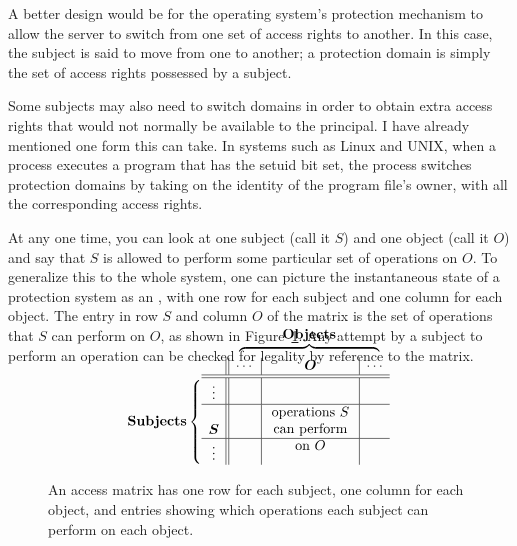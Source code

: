 A better design would be for the operating system's protection mechanism
to allow the server to switch from one set of access rights to
another.  In this case, the subject is said to move from one
 to another; a protection domain is
simply the set of access rights possessed by a subject.

Some subjects may also need to switch domains in order to obtain extra
access rights that would not normally be available to the principal.
I have already mentioned one form this can take.  In systems such as
Linux and UNIX, when a process executes a program that has the setuid
bit set, the process switches protection domains by taking on the
identity of the program file's owner, with all the corresponding
access rights.

At any one time, you can look at one subject (call it $S$) and
one object (call it $O$) and say that $S$ is allowed to perform
some particular set of operations on $O$.  To generalize this to the
whole system, one can picture the instantaneous state of a protection
system as an , with one row for each subject and
one column for each object.  The entry in row $S$ and column $O$ of
the matrix is the set of operations that $S$ can perform on $O$, as
shown in Figure~\ref{scan-7-3}.  Any
attempt by a subject to perform an operation can be checked for
legality by reference to the matrix.
\begin{figure}
\vspace{3.7em}
\[\mbox{\textbf{Subjects}}\left\{\vcenter{\vspace{-3.7em}\hbox{$\begin{array}{c||c|p{6em}|c}
\multicolumn{1}{c}{}&
\multicolumn{3}{c}{\overbrace{\hspace{10em}}^{\mbox{\textbf{Objects}}}}\\
 &\cdots&\multicolumn{1}{c|}{\mbox{\boldmath$O$}}&\cdots\\\hline\hline
 \vdots&&&\\\hline
 \lower 1.25em \hbox{\boldmath$S$}&&{\centering operations $S$\\can perform\\on
   $O$\\\vspace{-1.2em}}&\\\hline
 \vdots&&&
 \end{array}$}}\right.\]
\caption{An access matrix has one row for each subject, one column
  for each object, and entries showing which operations each subject can
  perform on each object.}
\label{scan-7-3}
\end{figure}

